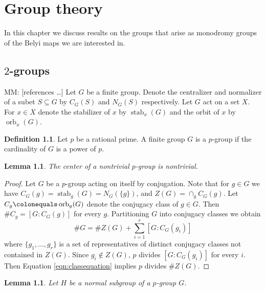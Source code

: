 \documentclass{dcthesis}
\newcommand{\defi}[1]{\textsf{#1}}
\newcommand{\mm}[1]{{\color{blue} \sf MM: [#1]}}
\DeclareMathOperator{\stab}{stab}
\DeclareMathOperator{\orb}{orb}
\newtheorem{lemma}[prop]{Lemma}
\theoremstyle{definition}
\newtheorem{definition}[prop]{Definition}
\theoremstyle{remark}
\numberwithin{equation}{section}
\numberwithin{figure}{section}
\begin{document}
\chapter{Group theory}{\label{chapter:grouptheory}
  In this chapter we discuss results on the groups
  that arise as monodromy groups
  of the Belyi maps we are interested in.
  \section{$2$-groups}{\label{sec:twogroups}
    \mm{references \cite{DF}\ldots}
    Let $G$ be a finite group.
    Denote the \defi{centralizer} and
    \defi{normalizer} of a subet $S\subseteq G$
    by $C_G(S)$ and $N_G(S)$ respectively.
    Let $G$ act on a set $X$.
    For $x\in X$
    denote the \defi{stabilizer of $x$} by
    $\stab_x(G)$
    and the \defi{orbit of $x$} by
    $\orb_x(G)$.
    \begin{definition}
      \label{def:pgroup}
      Let $p$ be a rational prime.
      A finite group $G$ is a
      \defi{$p$-group}
      if the cardinality of $G$
      is a power of $p$.
    \end{definition}
    \begin{lemma}
      \label{lem:pgrouphasacenter}
      The center of a nontrivial $p$-group is nontrivial.
    \end{lemma}
    \begin{proof}
      Let $G$ be a $p$-group acting on itself by conjugation.
      Note that for $g\in G$ we have
      $C_G(g)=\stab_g(G)=N_G(\{g\})$,
      and
      $Z(G)=\cap_g C_G(g)$.
      Let
      $C_g\colonequals\orb_g(G)$
      denote the conjugacy class of $g\in G$.
      Then $\#C_g = [G:C_G(g)]$ for every $g$.
      Partitioning $G$ into conjugacy classes we obtain
      \begin{equation}\label{eqn:classequation}
        \#G =
        \#Z(G)+\sum_{i=1}^r[G:C_G(g_i)]
      \end{equation}
      where $\{g_1,\dots,g_r\}$ is a set of representatives of distinct
      conjugacy classes not contained in $Z(G)$.
      Since $g_i\not\in Z(G)$, $p$ divides $[G:C_G(g_i)]$ for every $i$.
      Then Equation \ref{eqn:classequation} implies $p$ divides
      $\#Z(G)$.
    \end{proof}
    \begin{lemma}
      \label{lem:conjugacyinsubgroups}
      Let $H$ be a normal subgroup of a $p$-group $G$.

\end{lemma}}}
\end{document}

